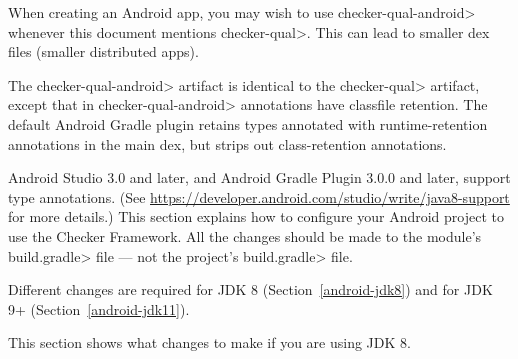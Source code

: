 When creating an Android app, you may wish to use \<checker-qual-android>
whenever this document mentions \<checker-qual>.  This can lead to smaller
dex files (smaller distributed apps).

The \<checker-qual-android> artifact is identical to the \<checker-qual>
artifact, except that in \<checker-qual-android> annotations have classfile
retention.  The default Android Gradle plugin retains types annotated with
runtime-retention annotations in the main dex, but strips out class-retention
annotations.



Android Studio 3.0 and later, and Android Gradle Plugin 3.0.0 and later, support type
annotations.  (See
\url{https://developer.android.com/studio/write/java8-support}
for more details.)  This section explains how to configure your Android
project to use the Checker Framework.  All the changes should be made to
the module's \<build.gradle> file --- not the project's \<build.gradle> file.

Different changes are required for JDK 8
(Section~\ref{android-jdk8}) and for JDK 9+ (Section~\ref{android-jdk11}).

This section shows what changes to make if you are using JDK 8.


